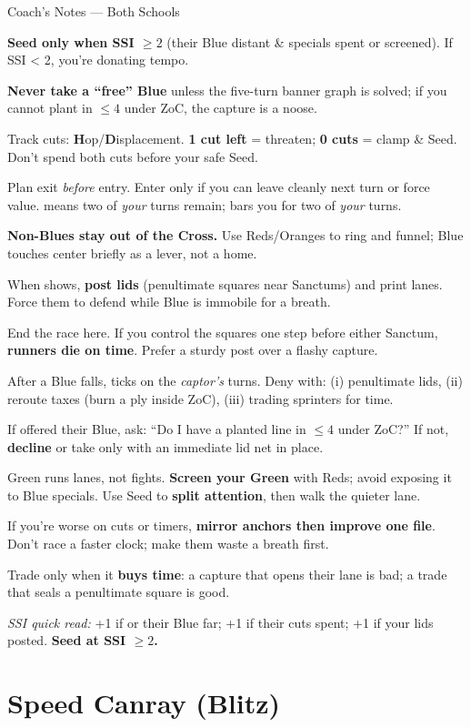\documentclass[11pt]{article}
\newcommand{\CC}[1]{\textcolor{blue!60!black}{\scriptsize\ttfamily[CF:#1]}}
\newcommand{\RoC}{\textcolor{teal!60!black}{\scriptsize\ttfamily[Rooted]}}
\newcommand{\RC}{\textcolor{purple!70!black}{\scriptsize\ttfamily[RC]}}
\newenvironment{coachnotes}[1]{%
  \begin{coachbox}{#1}%
    \footnotesize
    \begin{description}[leftmargin=2.8cm,labelsep=0.6em,font=\scshape,
                        itemsep=0.25em,parsep=0pt,topsep=0.2em]
}{%
    \end{description}%
  \end{coachbox}%
}
\newcommand{\CNRow}[2]{\item[#1] #2}
\renewcommand{\RC}[1][]{%
  \textcolor{purple!70!black}{\scriptsize\ttfamily[RC%
  \if\relax\detokenize{#1}\relax\else~#1\fi]}}
\begin{document}
\begin{coachnotes}{Coach’s Notes — Both Schools}
  \CNRow{Seed discipline}{\textbf{Seed only when SSI $\ge 2$} (their Blue distant \& specials spent or screened). If SSI < 2, you’re donating tempo.}
  \CNRow{“Free” Blue test}{\textbf{Never take a “free” Blue} unless the five-turn banner graph is solved; if you cannot plant in $\le 4$ under ZoC, the capture is a noose.}
  \CNRow{Blue specials}{Track cuts: \textbf{H}op/\textbf{D}isplacement. \textbf{1 cut left} = threaten; \textbf{0 cuts} = clamp \& Seed. Don’t spend both cuts before your safe Seed.}
  \CNRow{Cross math}{Plan exit \emph{before} entry. Enter only if you can leave cleanly next turn or force value. \CC{in 1/3} means two of \emph{your} turns remain; \CC{ex 1/2} bars you for two of \emph{your} turns.}
  \CNRow{Ring over Cross}{\textbf{Non-Blues stay out of the Cross.} Use Reds/Oranges to ring and funnel; Blue touches center briefly as a lever, not a home.}
  \CNRow{Rooted punish}{When \RoC{} shows, \textbf{post lids} (penultimate squares near Sanctums) and print lanes. Force them to defend while Blue is immobile for a breath.}
  \CNRow{Penultimate squares}{End the race here. If you control the squares one step before either Sanctum, \textbf{runners die on time}. Prefer a sturdy post over a flashy capture.}
  \CNRow{Reforge denial}{After a Blue falls, \RC{} ticks on the \emph{captor’s} turns. Deny with: (i) penultimate lids, (ii) reroute taxes (burn a ply inside ZoC), (iii) trading sprinters for time.}
  \CNRow{Poison capture}{If offered their Blue, ask: “Do I have a planted line in $\le 4$ under ZoC?” If not, \textbf{decline} or take only with an immediate lid net in place.}
  \CNRow{Green usage}{Green runs lanes, not fights. \textbf{Screen your Green} with Reds; avoid exposing it to Blue specials. Use Seed to \textbf{split attention}, then walk the quieter lane.}
  \CNRow{Mirror rule}{If you’re worse on cuts or timers, \textbf{mirror anchors then improve one file}. Don’t race a faster clock; make them waste a breath first.}
  \CNRow{Tempo trades}{Trade only when it \textbf{buys time}: a capture that opens their lane is bad; a trade that seals a penultimate square is good.}
\end{coachnotes}

{\footnotesize\textit{SSI quick read:} +1 if \CC{ex 1/2} or their Blue far; +1 if their cuts spent; +1 if your lids posted. \textbf{Seed at SSI $\ge2$.}}

\clearpage

\section{Speed Canray (Blitz)}
\end{document}
